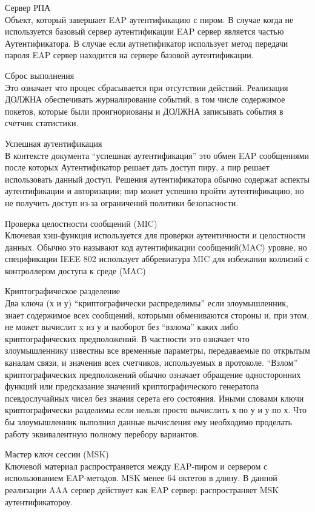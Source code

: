 Сервер РПА \\ Объект, который завершает EAP аутентификацию с пиром. В случае когда не используется базовый сервер аутентификации EAP сервер является частью Аутентификатора. В случае если аутнетификатор использует метод передачи пароля EAP сервер находится на сервере базовой аутентификации.

Сброс выполнения \\ Это означает что процес сбрасывается при отсутствии действий. Реализация ДОЛЖНА обеспечивать журналирование событий, в том числе содержимое покетов, которые были проигнориованы и ДОЛЖНА записывать события в счетчик статистики.

Успешная аутентификация \\ В контексте документа ``успешная аутентификация'' это обмен EAP сообщениями после которых Аутентификатор решает дать доступ пиру, а пир решает использовать данный доступ. Решения аутентификатора обычно содержат аспекты аутентификации и авторизации; пир может успешно пройти аутентификацию, но не получить доступ из-за ограничений политики безопасности.

Проверка целостности сообщений (MIC) \\ Ключевая хэш-функция используется для проверки аутентичности и целостности данных. Обычно это называют код аутентификации сообщений(MAC) уровне, но спецификации IEEE 802 использует аббревиатура MIC для избежания коллизий с контроллером доступа к среде (MAC)

Криптографическое разделение \\ Два ключа (х и у) ``криптографически распределимы'' если злоумышленник, знает содержимое всех сообщений, которыми обмениваются стороны и, при этом, не может вычислит x из у и наоборот без ``взлома'' каких либо криптографических предположений. В частности это означает что злоумышленнику известны все временные параметры, передаваемые по открытым каналам связи, и значения всех счетчиков, используемых в протоколе. ``Взлом'' криптографических предположений обычно означает обращение односторонних функций или предсказание значений криптографического генератопа псевдослучайных чисел без знания серета его состояния. Иными словами ключи криптографически разделимы если нельзя просто вычислить х по у и у по х. Что бы злоумышленник выполнил данные вычисления ему необходимо проделать работу эквивалентную полному перебору вариантов.

Мастер ключ сессии (MSK) \\ Ключевой материал распространяется между EAP-пиром и сервером с использованием EAP-методов. MSK менее 64 октетов в длину. В данной реализации AAA сервер действует как EAP сервер: распространяет MSK аутентификатороу.

